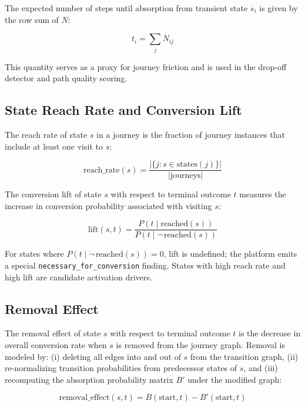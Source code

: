 \documentclass[12pt, a4paper]{article}
\begin{document}
The expected number of steps until absorption from transient state $s_i$ is given by the row sum of $N$:

\begin{equation}
  t_i = \sum_j N_{ij}
  \label{eq:expectedsteps}
\end{equation}

This quantity serves as a proxy for journey friction and is used in the drop-off detector and path quality scoring.

\subsection{State Reach Rate and Conversion Lift}

The reach rate of state $s$ in a journey is the fraction of journey instances that include at least one visit to $s$:

\begin{equation}
  \text{reach\_rate}(s) = \frac{|\{j : s \in \text{states}(j)\}|}{|\text{journeys}|}
  \label{eq:reachrate}
\end{equation}

The conversion lift of state $s$ with respect to terminal outcome $t$ measures the increase in conversion probability associated with visiting $s$:

\begin{equation}
  \text{lift}(s, t) = \frac{P(t \mid \text{reached}(s))}{P(t \mid \neg\,\text{reached}(s))}
  \label{eq:lift}
\end{equation}

For states where $P(t \mid \neg\,\text{reached}(s)) = 0$, lift is undefined; the platform emits a special \texttt{necessary\_for\_conversion} finding. States with high reach rate and high lift are candidate activation drivers.

\subsection{Removal Effect}

The removal effect of state $s$ with respect to terminal outcome $t$ is the decrease in overall conversion rate when $s$ is removed from the journey graph. Removal is modeled by: (i) deleting all edges into and out of $s$ from the transition graph, (ii) re-normalizing transition probabilities from predecessor states of $s$, and (iii) recomputing the absorption probability matrix $B'$ under the modified graph:

\begin{equation}
  \text{removal\_effect}(s, t) = B(\text{start}, t) - B'(\text{start}, t)
  \label{eq:removal}
\end{equation}
\end{document}
